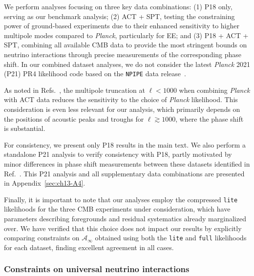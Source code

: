 We perform analyses focusing on three key data combinations: (1) P18 only, serving as our benchmark analysis; (2) ACT + SPT, testing the constraining power of ground-based experiments due to their enhanced sensitivity to higher multipole modes compared to \textit{Planck}, particularly for EE; and (3) P18 + ACT + SPT, combining all available CMB data to provide the most stringent bounds on neutrino interactions through precise measurements of the corresponding phase shift. In our combined dataset analyses, we do not consider the latest \textit{Planck} 2021 (P21) PR4 likelihood code based on the \texttt{NPIPE} data release~\cite{Planck:2020olo}.

As noted in Refs.~\cite{ACT:2025fju,ACT:2025tim}, the multipole truncation at $\ell< 1000$ when combining \textit{Planck} with ACT data reduces the sensitivity to the choice of \textit{Planck} likelihood. This consideration is even less relevant for our analysis, which primarily depends on the positions of acoustic peaks and troughs for $\ell \gtrsim 1000$, where the phase shift is substantial.

For consistency, we present only P18 results in the main text. We also perform a standalone P21 analysis to verify consistency with P18, partly motivated by minor differences in phase shift measurements between these datasets identified in Ref.~\cite{Montefalcone:2025unv}. This P21 analysis and all supplementary data combinations are presented in Appendix~\ref{sec:ch13-A4}.

Finally, it is important to note that our analyses employ the compressed \texttt{lite} likelihoods for the three CMB experiments under consideration, which have parameters describing foregrounds and residual systematics already marginalized over. We have verified that this choice does not impact our results by explicitly comparing constraints on $\mathcal{A}_\infty$ obtained using both the \texttt{lite} and \texttt{full} likelihoods for each dataset, finding excellent agreement in all cases.

\subsubsection{Constraints on universal neutrino interactions}

